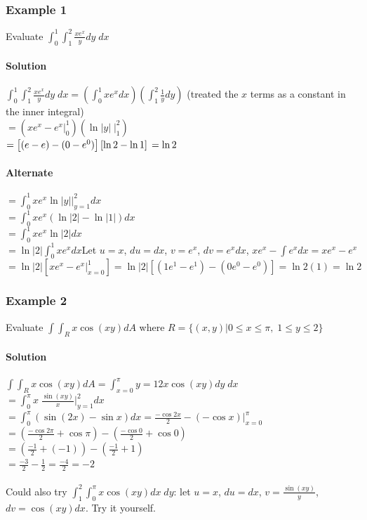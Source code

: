 \documentclass{article}
\newcommand{\Int}[2]{\int_{#1}^{#2}}
\newcommand{\eval}[2]{\bigg|_{#1}^{#2}}
\begin{document}
\subsubsection{Example 1}
Evaluate $\Int{0}{1}\Int{1}{2}\frac{xe^x}{y}dy\;dx$
\paragraph{Solution} $\Int{0}{1}\Int{1}{2}\frac{xe^x}{y}dy\;dx=\left(\Int{0}{1}xe^xdx\right)\left(\Int{1}{2}\frac{1}{y}dy\right)$ (treated the $x$ terms as a constant in the inner integral)
\\$=\left(xe^x-e^x\eval{0}{1}\right)\left(\ln|y|\;\eval{1}{2}\right)$
\\$=\left[(e-e)-(0-e^0)\right]\left[\ln2-\ln1\right]
\\=\ln2$

\paragraph{Alternate}
$=\Int{0}{1}xe^x\ln|y|\eval{y=1}{2}dx$
\\$=\Int{0}{1}xe^{x}(\ln|2|-\ln|1|)dx$
\\$=\Int{0}{1}xe^{x}\ln|2|dx$
\\$=\ln|2|\Int{0}{1}xe^{x}dx$\quad Let $u=x$, $du=dx$, $v=e^x$, $dv=e^xdx$, $xe^{x}-\int e^xdx=xe^{x}-e^x$
\\$=\ln|2|\left[xe^x-e^x\eval{x=0}{1}\right]=\ln|2|\left[(1e^1-e^1)-(0e^0-e^0)\right]=\ln2(1)=\ln2$

\subsubsection{Example 2}
Evaluate $\int\Int{R}{}x\cos(xy)dA$ where $R=\{(x,y)|0\leq x\leq\pi,\;1\leq y\leq2\}$
\paragraph{Solution} $\int\Int{R}{}x\cos(xy)dA=\Int{x=0}{\pi}{y=1}{2}x\cos(xy)dy\;dx$
\\$=\Int{0}{\pi}x\;\frac{\sin(xy)}{x}\eval{y=1}{2}dx$
\\$=\Int{0}{\pi}(\sin(2x)-\sin x)dx=\frac{-\cos2x}{2}-(-\cos x)\eval{x=0}{\pi}$
\\$=\left(\frac{-\cos2\pi}{2}+\cos\pi\right)-\left(\frac{-\cos0}{2}+\cos0\right)$
\\$=(\frac{-1}{2}+(-1))-(\frac{-1}{2}+1)$
\\$=\frac{-3}{2}-\frac{1}{2}=\frac{-4}{2}=-2$
\\\\Could also try $\Int{1}{2}\Int{0}{\pi}x\cos(xy)dx\;dy$: let $u=x$, $du=dx$, $v=\frac{\sin(xy)}{y}$, $dv=\cos(xy)dx$. Try it yourself.
\end{document}
